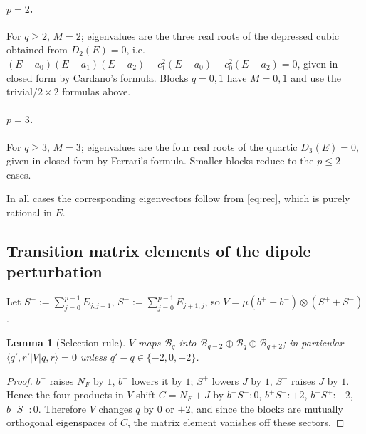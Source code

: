 \documentclass[12pt]{article}
\newtheorem{lemma}{Lemma}
\theoremstyle{definition}
\theoremstyle{remark}
\newcommand{\ket}[1]{\lvert #1\rangle}
\newcommand{\bra}[1]{\langle #1\rvert}
\newcommand{\bp}{b^{+}}
\newcommand{\bm}{b^{-}}
\begin{document}
\paragraph{$p=2$.} For $q\ge2$, $M=2$; eigenvalues are the three real roots of the
depressed cubic obtained from $D_2(E)=0$, i.e.
$(E-a_0)(E-a_1)(E-a_2)-c_1^2(E-a_0)-c_0^2(E-a_2)=0$, given in closed form by
Cardano's formula. Blocks $q=0,1$ have $M=0,1$ and use the trivial/$2\times2$
formulas above.

\paragraph{$p=3$.} For $q\ge3$, $M=3$; eigenvalues are the four real roots of the
quartic $D_3(E)=0$, given in closed form by Ferrari's formula. Smaller blocks
reduce to the $p\le2$ cases.

In all cases the corresponding eigenvectors follow from \eqref{eq:rec}, which is
purely rational in $E$.

\subsection{Transition matrix elements of the dipole perturbation}

Let $S^{+}:=\sum_{j=0}^{p-1}E_{j,j+1}$, $S^{-}:=\sum_{j=0}^{p-1}E_{j+1,j}$, so
$V=\mu(\bp+\bm)\otimes(S^{+}+S^{-})$.

\begin{lemma}[Selection rule]\label{lem:selection}
$V$ maps $\mathcal B_q$ into $\mathcal B_{q-2}\oplus\mathcal B_q\oplus\mathcal B_{q+2}$;
in particular $\bra{q',r'}V\ket{q,r}=0$ unless $q'-q\in\{-2,0,+2\}$.
\end{lemma}

\begin{proof}
$\bp$ raises $N_F$ by $1$, $\bm$ lowers it by $1$; $S^{+}$ lowers $J$ by $1$,
$S^{-}$ raises $J$ by $1$. Hence the four products in $V$ shift $C=N_F+J$ by
$\bp S^{+}\!:0$, $\bp S^{-}\!:+2$, $\bm S^{+}\!:-2$, $\bm S^{-}\!:0$. Therefore $V$
changes $q$ by $0$ or $\pm2$, and since the blocks are mutually orthogonal
eigenspaces of $C$, the matrix element vanishes off these sectors.
\end{proof}
\end{document}

